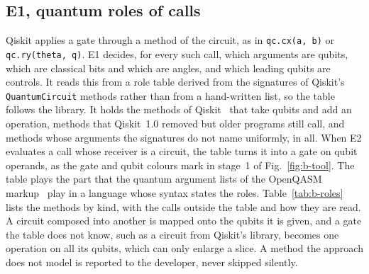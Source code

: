 \subsection{E1, quantum roles of calls}
Qiskit applies a gate through a method of the circuit, as in \texttt{qc.cx(a, b)} or \texttt{qc.ry(theta, q)}. E1
decides, for every such call, which arguments are qubits, which are classical bits and which are angles, and which
leading qubits are controls. It reads this from a role table derived from the signatures of Qiskit's
\texttt{QuantumCircuit} methods rather than from a hand-written list, so the table follows the library. It holds the
\numToolGateQiskit{} methods of Qiskit~\numQiskitVersion{} that take qubits and add an operation, \numToolGateLegacy{}
methods that Qiskit~1.0 removed but older programs still call, and \numToolGateSpecial{} methods whose arguments the
signatures do not name uniformly, \numToolGateTable{} in all. When E2 evaluates a call whose receiver is a circuit,
the table turns it into a gate on qubit operands, as the gate and qubit colours mark in stage~1 of
Fig.~\ref{fig:b-tool}. The table plays the part that the quantum argument lists of the OpenQASM
markup~\cite{behler2024supporting} play in a language whose syntax states the roles. Table~\ref{tab:b-roles} lists the methods by kind, with the
calls outside the table and how they are read. A circuit composed into another is mapped onto the qubits it is given,
and a gate the table does not know, such as a circuit from Qiskit's library, becomes one operation on all its qubits,
which can only enlarge a slice. A method the approach does not model is reported to the developer, never skipped
silently.

